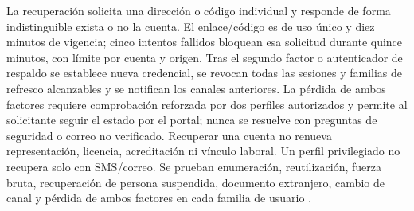 La recuperación solicita una dirección o código individual y responde de forma indistinguible exista o no la cuenta. El enlace/código es de uso único y diez minutos de vigencia; cinco intentos fallidos bloquean esa solicitud durante quince minutos, con límite por cuenta y origen. Tras el segundo factor o autenticador de respaldo se establece nueva credencial, se revocan todas las sesiones y familias de refresco alcanzables y se notifican los canales anteriores. La pérdida de ambos factores requiere comprobación reforzada por dos perfiles autorizados y permite al solicitante seguir el estado por el portal; nunca se resuelve con preguntas de seguridad o correo no verificado. Recuperar una cuenta no renueva representación, licencia, acreditación ni vínculo laboral. Un perfil privilegiado no recupera solo con SMS/correo. Se prueban enumeración, reutilización, fuerza bruta, recuperación de persona suspendida, documento extranjero, cambio de canal y pérdida de ambos factores en cada familia de usuario \parencite[RT-12.04--06 y RT-12.12]{bases-transversales}.
